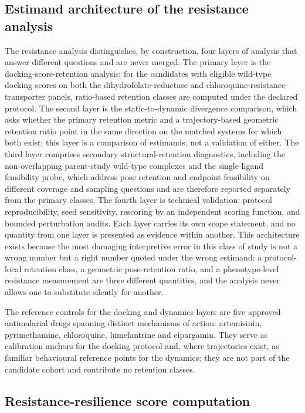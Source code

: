 \subsection{Estimand architecture of the resistance analysis}

The resistance analysis distinguishes, by construction, four layers of analysis that answer different questions and are never merged. The primary layer is the docking-score-retention analysis: for the candidates with eligible wild-type docking scores on both the dihydrofolate-reductase and chloroquine-resistance-transporter panels, ratio-based retention classes are computed under the declared protocol. The second layer is the static-to-dynamic divergence comparison, which asks whether the primary retention metric and a trajectory-based geometric retention ratio point in the same direction on the matched systems for which both exist; this layer is a comparison of estimands, not a validation of either. The third layer comprises secondary structural-retention diagnostics, including the non-overlapping parent-study wild-type complexes and the single-ligand feasibility probe, which address pose retention and endpoint feasibility on different coverage and sampling questions and are therefore reported separately from the primary classes. The fourth layer is technical validation: protocol reproducibility, seed sensitivity, rescoring by an independent scoring function, and bounded perturbation audits. Each layer carries its own scope statement, and no quantity from one layer is presented as evidence within another. This architecture exists because the most damaging interpretive error in this class of study is not a wrong number but a right number quoted under the wrong estimand: a protocol-local retention class, a geometric pose-retention ratio, and a phenotype-level resistance measurement are three different quantities, and the analysis never allows one to substitute silently for another.

The reference controls for the docking and dynamics layers are five approved antimalarial drugs spanning distinct mechanisms of action: artemisinin, pyrimethamine, chloroquine, lumefantrine and cipargamin. They serve as calibration anchors for the docking protocol and, where trajectories exist, as familiar behavioural reference points for the dynamics; they are not part of the candidate cohort and contribute no retention classes.

\subsection{Resistance-resilience score computation}\label{sec:rrs_definition}


